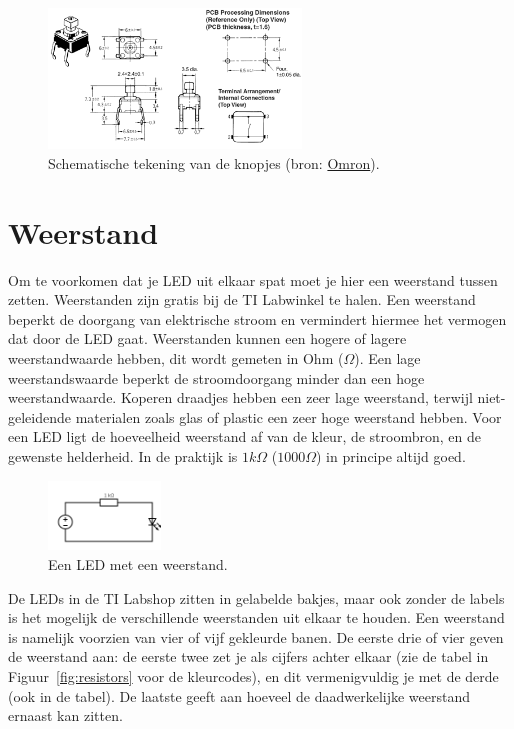 \documentclass{guide}
\begin{document}
\begin{figure}[h]
  \centering
  \vspace{3mm}
  \includegraphics[width=0.6\textwidth]{images/button.png}
  \caption{Schematische tekening van de knopjes (bron: \href{https://www.google.com/url?sa=i&rct=j&q=&esrc=s&source=images&cd=&cad=rja&uact=8&ved=2ahUKEwiJ387Z9MndAhUO6qQKHafLD_kQjRx6BAgBEAU&url=https\%3A\%2F\%2Fecb.omron.com.sg\%2Fproduct-detail\%3FpartId\%3D460&psig=AOvVaw3-QL0EFgRXec_37ypIDQD0&ust=1537544210056281}{Omron}).} \label{fig:button}
\end{figure}

\section{Weerstand}
Om te voorkomen dat je LED uit elkaar spat moet je hier een weerstand tussen zetten. Weerstanden zijn gratis bij de TI Labwinkel te halen. Een weerstand beperkt de doorgang van elektrische stroom en vermindert hiermee het vermogen dat door de LED gaat. Weerstanden kunnen een hogere of lagere weerstandwaarde hebben, dit wordt gemeten in Ohm ($\Omega$). Een lage weerstandswaarde beperkt de stroomdoorgang minder dan een hoge weerstandwaarde. Koperen draadjes hebben een zeer lage weerstand, terwijl niet-geleidende materialen zoals glas of plastic een zeer hoge weerstand hebben. Voor een LED ligt de hoeveelheid weerstand af van de kleur, de stroombron, en de gewenste helderheid. In de praktijk is $1 k\Omega$ ($1000 \Omega$) in principe altijd goed.

\begin{figure}[h]
  \centering
  \includegraphics[width=3cm]{images/circuit.png}
  \caption{Een LED met een weerstand.} \label{fig:circuit}
\end{figure}

De LEDs in de TI Labshop zitten in gelabelde bakjes, maar ook zonder de labels is het mogelijk de verschillende weerstanden uit elkaar te houden. Een weerstand is namelijk voorzien van vier of vijf gekleurde banen. De eerste drie of vier geven de weerstand aan: de eerste twee zet je als cijfers achter elkaar (zie de tabel in Figuur~\ref{fig:resistors} voor de kleurcodes), en dit vermenigvuldig je met de derde (ook in de tabel). De laatste geeft aan hoeveel de daadwerkelijke weerstand ernaast kan zitten.
\end{document}
